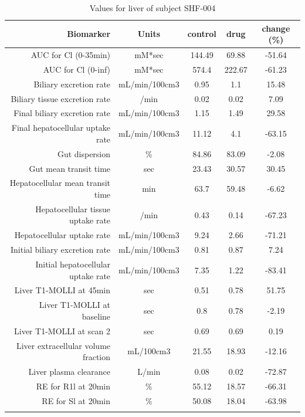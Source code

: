 \documentclass{epflreport}%
\begin{document}
%
\clearpage%
\begin{longtable}{rcccc}%
\hline%
Biomarker&Units&control&drug&change (\%)\\%
\hline%
AUC for Cl (0{-}35min)&mM*sec&144.49&69.88&{-}51.64\\%
AUC for Cl (0{-}inf)&mM*sec&574.4&222.67&{-}61.23\\%
Biliary excretion rate&mL/min/100cm3&0.95&1.1&15.48\\%
Biliary tissue excretion rate&/min&0.02&0.02&7.09\\%
Final biliary excretion rate&mL/min/100cm3&1.15&1.49&29.58\\%
Final hepatocellular uptake rate&mL/min/100cm3&11.12&4.1&{-}63.15\\%
Gut dispersion&\%&84.86&83.09&{-}2.08\\%
Gut mean transit time&sec&23.43&30.57&30.45\\%
Hepatocellular mean transit time&min&63.7&59.48&{-}6.62\\%
Hepatocellular tissue uptake rate&/min&0.43&0.14&{-}67.23\\%
Hepatocellular uptake rate&mL/min/100cm3&9.24&2.66&{-}71.21\\%
Initial biliary excretion rate&mL/min/100cm3&0.81&0.87&7.24\\%
Initial hepatocellular uptake rate&mL/min/100cm3&7.35&1.22&{-}83.41\\%
Liver T1{-}MOLLI at 45min&sec&0.51&0.78&51.75\\%
Liver T1{-}MOLLI at baseline&sec&0.8&0.78&{-}2.19\\%
Liver T1{-}MOLLI at scan 2&sec&0.69&0.69&0.19\\%
Liver extracellular volume fraction&mL/100cm3&21.55&18.93&{-}12.16\\%
Liver plasma clearance&L/min&0.08&0.02&{-}72.87\\%
RE for R1l at 20min&\%&55.12&18.57&{-}66.31\\%
RE for Sl at 20min&\%&50.08&18.04&{-}63.98\\%
\hline%
\caption{Values for liver of subject SHF-004} \\%
\end{longtable}%
\end{document}
